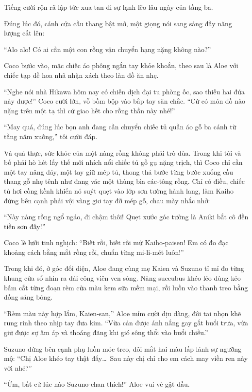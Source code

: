 \documentclass[../main.tex]{subfiles}
\begin{document}
Tiếng cười rộn rã lập tức xua tan đi sự lạnh lẽo lâu ngày của tầng ba.

Đúng lúc đó, cánh cửa cầu thang bật mở, một giọng nói sang sảng đầy năng lượng cất lên:

``Alo alo! Có ai cần một con rồng vận chuyển hạng nặng không nào?''

Coco bước vào, mặc chiếc áo phông ngắn tay khỏe khoắn, theo sau là Aloe với chiếc tạp dề hoa nhã nhặn xách theo làn đồ ăn nhẹ.

``Nghe nói nhà Hikawa hôm nay có chiến dịch đại tu phòng ốc, sao thiếu hai đứa này được!'' Coco cười lớn, vỗ bồm bộp vào bắp tay săn chắc. ``Cứ có món đồ nào nặng trên một tạ thì cứ giao hết cho rồng thần này nhé!''

``May quá, đúng lúc bọn anh đang cần chuyển chiếc tủ quần áo gỗ ba cánh từ tầng năm xuống,'' tôi cười đáp.

Và quả thực, sức khỏe của một nàng rồng không phải trò đùa. Trong khi tôi và bố phải hò hét lấy thế mới nhích nổi chiếc tủ gỗ gụ nặng trịch, thì Coco chỉ cần một tay nâng đáy, một tay giữ mép tủ, thong thả bước từng bước xuống cầu thang gỗ nhẹ tênh như đang vác một thùng bìa các-tông rỗng. Chỉ có điều, chiếc tủ hơi cồng kềnh khiến nó suýt quẹt vào lớp sơn tường hành lang, làm Kaiho đứng bên cạnh phải vội vàng giơ tay đỡ mép gỗ, chau mày nhắc nhở:

``Này nàng rồng ngổ ngáo, đi chậm thôi! Quẹt xước góc tường là Aniki bắt cô đền tiền sơn đấy!''

Coco lè lưỡi tinh nghịch: ``Biết rồi, biết rồi mừ Kaiho-paisen! Em có đo đạc khoảng cách bằng mắt rồng rồi, chuẩn từng mi-li-mét luôn!''

Trong khi đó, ở góc đối diện, Aloe đang cùng mẹ Kaien và Suzuno tỉ mỉ đo từng khung cửa sổ nhìn ra dải công viên ven sông. Nàng succubus khéo léo dùng kéo bấm cắt từng đoạn rèm cửa màu kem sữa mềm mại, rồi luồn vào thanh treo bằng đồng sáng bóng.

``Rèm màu này hợp lắm, Kaien-san,'' Aloe mỉm cười dịu dàng, đôi tai nhọn khẽ rung rinh theo nhịp tay đưa kim. ``Vừa cản được ánh nắng gay gắt buổi trưa, vừa giữ được sự ấm áp và thoáng đãng khi gió sông thổi vào buổi chiều.''

Suzuno đứng bên cạnh phụ luồn móc treo, đôi mắt hai màu lấp lánh sự ngưỡng mộ: ``Chị Aloe khéo tay thật đấy\dots\ Sau này chị chỉ cho em cách may viền ren này với nhé?''

``Ừm, bất cứ lúc nào Suzuno-chan thích!'' Aloe vui vẻ gật đầu.
\end{document}
